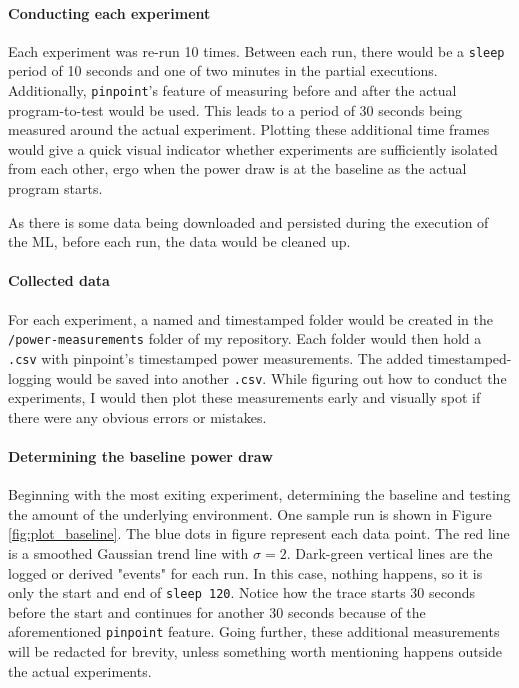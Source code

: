 
\paragraph{Conducting each experiment}

Each experiment was re-run 10 times. Between each run, there would be a \verb|sleep| period of 10 seconds and one of two minutes in the partial executions. 
Additionally, \verb|pinpoint|'s feature of measuring before and after the actual program-to-test would be used. 
This leads to a period of 30 seconds being measured around the actual experiment. 
Plotting these additional time frames would give a quick visual indicator whether experiments are sufficiently isolated from each other, ergo when the power draw is at the baseline as the actual program starts.

As there is some data being downloaded and persisted during the execution of the ML, before each run, the data would be cleaned up.

\paragraph{Collected data}

For each experiment, a named and timestamped folder would be created in the \verb|/power-measurements| folder of my repository. Each folder would then hold a \verb|.csv| with pinpoint's timestamped power measurements. 
The added timestamped-logging would be saved into another \verb|.csv|. 
While figuring out how to conduct the experiments, I would then plot these measurements early and visually spot if there were any obvious errors or mistakes.

\paragraph{Determining the baseline power draw}

Beginning with the most exiting experiment, determining the baseline and testing the amount of the underlying environment. 
One sample run is shown in Figure \ref{fig:plot_baseline}.
The blue dots in figure represent each data point. The red line is a smoothed Gaussian trend line with $\sigma = 2$. 
Dark-green vertical lines are the logged or derived "events" for each run. In this case, nothing happens, so it is only the start and end of \verb|sleep 120|. 
Notice how the trace starts 30 seconds before the start and continues for another 30 seconds because of the aforementioned \verb|pinpoint| feature.
Going further, these additional measurements will be redacted for brevity, unless something worth mentioning happens outside the actual experiments.

